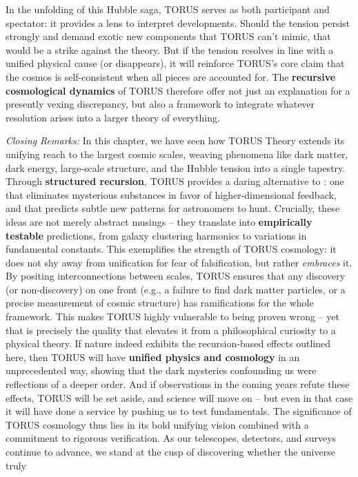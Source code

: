 \documentclass[]{article}
\begin{document}
In the unfolding of this Hubble saga, TORUS serves as both participant
and spectator: it provides a lens to interpret developments. Should the
tension persist strongly and demand exotic new components that TORUS
can't mimic, that would be a strike against the theory. But if the
tension resolves in line with a unified physical cause (or disappears),
it will reinforce TORUS's core claim that the cosmos is self-consistent
when all pieces are accounted for. The \textbf{recursive cosmological
dynamics} of TORUS therefore offer not just an explanation for a
presently vexing discrepancy, but also a framework to integrate whatever
resolution arises into a larger theory of everything.

\emph{Closing Remarks:} In this chapter, we have seen how TORUS Theory
extends its unifying reach to the largest cosmic scales, weaving
phenomena like dark matter, dark energy, large-scale structure, and the
Hubble tension into a single tapestry. Through \textbf{structured
recursion}, TORUS provides a daring alternative to \LambdaCDM: one that
eliminates mysterious substances in favor of higher-dimensional
feedback, and that predicts subtle new patterns for astronomers to hunt.
Crucially, these ideas are not merely abstract musings -- they translate
into \textbf{empirically testable} predictions, from galaxy clustering
harmonics to variations in fundamental constants​. This exemplifies the
strength of TORUS cosmology: it does not shy away from unification for
fear of falsification, but rather \emph{embraces} it. By positing
interconnections between scales, TORUS ensures that any discovery (or
non-discovery) on one front (e.g., a failure to find dark matter
particles, or a precise measurement of cosmic structure) has
ramifications for the whole framework. This makes TORUS highly
vulnerable to being proven wrong -- yet that is precisely the quality
that elevates it from a philosophical curiosity to a physical theory. If
nature indeed exhibits the recursion-based effects outlined here, then
TORUS will have \textbf{unified physics and cosmology} in an
unprecedented way, showing that the dark mysteries confounding us were
reflections of a deeper order. And if observations in the coming years
refute these effects, TORUS will be set aside, and science will move on
-- but even in that case it will have done a service by pushing us to
test fundamentals. The significance of TORUS cosmology thus lies in its
bold unifying vision combined with a commitment to rigorous
verification. As our telescopes, detectors, and surveys continue to
advance, we stand at the cusp of discovering whether the universe truly
\end{document}
